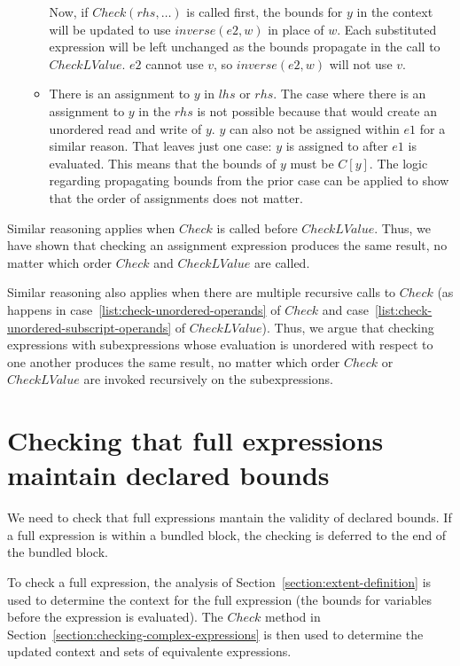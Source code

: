 \begin{itemize}
\begin{itemize}
Now, if $Check(rhs, \ldots)$ is called first, the bounds for $y$ in the context will be updated to use
$inverse(e2, w)$ in place of $w$.  Each substituted expression will be left unchanged as the bounds
propagate in the call to $CheckLValue$.  $e2$ cannot use $v$, so $inverse(e2, w)$ will not use $v$.

\item There is an assignment to $y$ in $lhs$ or $rhs$.   The case where there is an assignment 
to $y$ in the $rhs$ is not possible because that would create an unordered read and write of $y$.
$y$ can also not be assigned within $e1$ for a similar reason.  That leaves just one case: $y$ is
assigned to after $e1$ is evaluated.  This means that the bounds of $y$ must be $C[y]$.   The logic
regarding propagating bounds from the prior case can be applied to show that the order of
assignments does not matter.
\end{itemize}
\end{itemize}

Similar reasoning applies when $Check$ is called before $CheckLValue$. Thus, we have shown that
checking an assignment expression produces the same result, no matter which order $Check$ and
$CheckLValue$ are called.

Similar reasoning also applies when there are multiple recursive calls to
$Check$ (as happens in case~\ref{list:check-unordered-operands} of $Check$ and
case~\ref{list:check-unordered-subscript-operands} of $CheckLValue$).  Thus, we argue
that checking expressions with subexpressions whose evaluation is unordered with
respect to one another produces the same result, no matter which order $Check$
or $CheckLValue$ are invoked recursively on the subexpressions.

\section{Checking that full expressions maintain declared bounds}
\label{section:checking-full-expressions}

We need to check that full expressions mantain the validity of
declared bounds.  If a full expression is within a
bundled block, the checking is deferred to the end of the bundled block.

To check a full expression, the analysis of 
Section~\ref{section:extent-definition} is used
to determine the context for the full expression (the bounds
for variables before the expression is evaluated). The $Check$
method in Section~\ref{section:checking-complex-expressions}
is then used to determine the updated context and sets of equivalente expressions.

